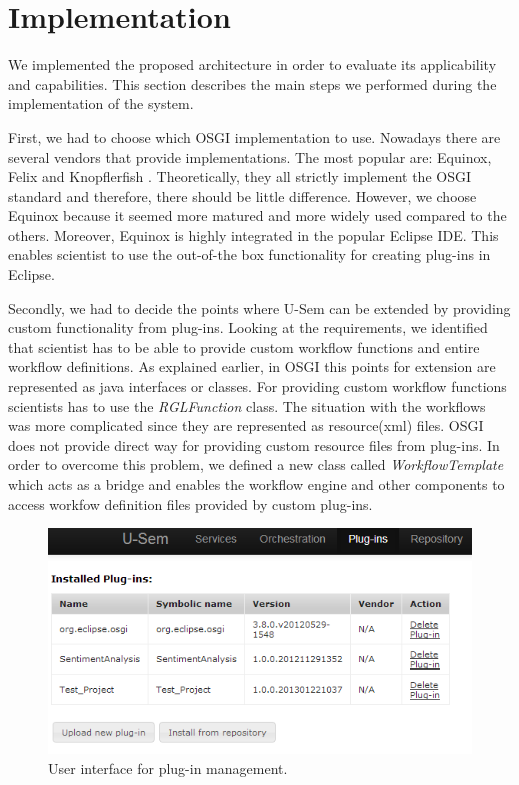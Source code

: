 \section{Implementation}
\label{sec:impl}

We implemented the proposed architecture in order to evaluate its applicability and capabilities. This section describes the main steps we performed during the implementation of the system.

First, we had to choose which OSGI implementation to use. Nowadays there are several vendors that provide implementations. The most popular are: Equinox, Felix and Knopflerfish \cite{OSGI}. Theoretically, they all strictly implement the OSGI standard and therefore, there should be little difference. However, we choose Equinox because it seemed more matured and more widely used compared to the others. Moreover, Equinox is highly integrated in the popular Eclipse IDE. This enables scientist to use the out-of-the box functionality for creating plug-ins in Eclipse.

Secondly, we had to decide the points where U-Sem can be extended by providing custom functionality from plug-ins. Looking at the requirements, we identified that scientist has to be able to provide custom workflow functions and entire workflow definitions. As explained earlier, in OSGI this points for extension are represented as java interfaces or classes. For providing custom workflow functions scientists has to use the \textit{RGLFunction} class. The situation with the workflows was more complicated since they are represented as resource(xml) files. OSGI does not provide direct way for providing custom resource files from plug-ins. In order to overcome this problem, we defined a new class called \textit{WorkflowTemplate} which acts as a bridge and enables the workflow engine and other components to access workfow definition files provided by custom plug-ins.

\begin{figure}[h!]
  \centering
  	\includegraphics[scale=0.70]{plug-in/ui/list.png}
  \caption{User interface for plug-in management.}
  \label{list_ui}
\end{figure}

